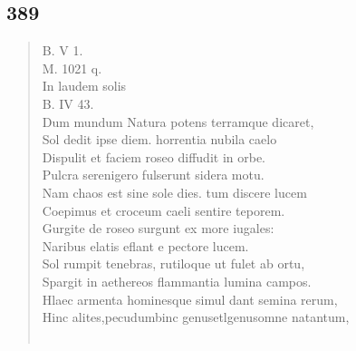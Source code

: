 \documentclass[11pt, a4paper]{report}
\begin{document}
            \subsection*{}
      \begin{verse}
      \end{verse}
  
            \subsection*{389}
      \begin{verse}
      B. V 1. \\ M. 1021 q. \\ In laudem solis \\ B. IV 43. \\ Dum mundum Natura potens terramque dicaret, \\ Sol dedit ipse diem. horrentia nubila caelo \\ Dispulit et faciem roseo diffudit in orbe. \\ Pulcra serenigero fulserunt sidera motu. \\ Nam chaos est sine sole dies. tum discere lucem \\ Coepimus et croceum caeli sentire teporem. \\ Gurgite  \lbrack de \rbrack  roseo surgunt ex more iugales: \\ Naribus elatis eflant e pectore lucem. \\ Sol rumpit tenebras, rutiloque ut fulet ab ortu, \\ Spargit in aethereos flammantia lumina campos. \\ Hlaec armenta hominesque simul dant semina rerum, \\ Hinc alites,pecudumbinc \lbrack genusetlgenusomne natantum, \\ 
        ﻿\pagebreak 

\end{verse}
\end{document}
